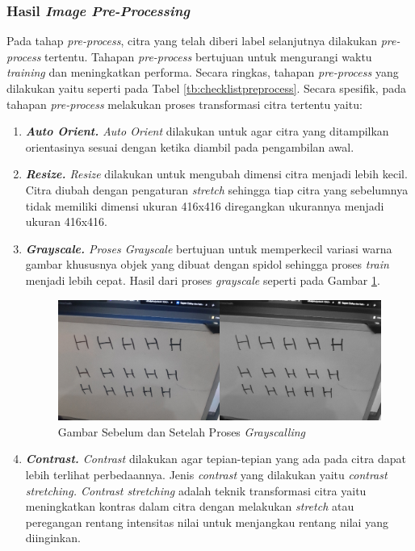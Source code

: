 \subsubsection{Hasil \textit{Image Pre-Processing}}
\label{subsubsec:hasilpreprocess}

Pada tahap \textit{pre-process}, citra yang telah diberi label selanjutnya dilakukan \textit{pre-process} tertentu. Tahapan \textit{pre-process} bertujuan untuk mengurangi waktu \textit{training} dan meningkatkan performa. Secara ringkas, tahapan \textit{pre-process} yang dilakukan yaitu seperti pada Tabel \ref*{tb:checklistpreprocess}. Secara spesifik, pada tahapan \textit{pre-process} melakukan proses transformasi citra tertentu yaitu:
\begin{enumerate}[nolistsep]
  \item \textit{\textbf{Auto Orient.} Auto Orient} dilakukan untuk agar citra yang ditampilkan orientasinya sesuai dengan ketika diambil pada pengambilan awal.
  \item \textit{\textbf{Resize.} Resize} dilakukan untuk mengubah dimensi citra menjadi lebih kecil. Citra diubah dengan pengaturan \textit{stretch} sehingga tiap citra yang sebelumnya tidak memiliki dimensi ukuran 416x416 diregangkan ukurannya menjadi ukuran 416x416.
  \item \textit{\textbf{Grayscale.} \textnormal{Proses} Grayscale} bertujuan untuk memperkecil variasi warna gambar khususnya objek yang dibuat dengan spidol sehingga proses \textit{train} menjadi lebih cepat. Hasil dari proses \textit{grayscale} seperti pada Gambar \ref{fig:grayscallingdataset}.
    \begin{figure}[H]
      \centering
      \includegraphics[scale=0.33]{gambar/grayscalling.png}
      \caption{Gambar Sebelum dan Setelah Proses \textit{Grayscalling}}
      \label{fig:grayscallingdataset}
    \end{figure}
  \item \textit{\textbf{Contrast.} Contrast} dilakukan agar tepian-tepian yang ada pada citra dapat lebih terlihat perbedaannya. Jenis \textit{contrast} yang dilakukan yaitu \textit{contrast stretching. Contrast stretching} adalah teknik transformasi citra yaitu meningkatkan kontras dalam citra dengan melakukan \textit{stretch} atau peregangan rentang intensitas nilai untuk menjangkau rentang nilai yang diinginkan.
\end{enumerate}

